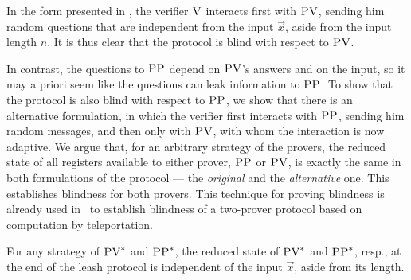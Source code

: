 \documentclass{toc}
\newcommand{\ver}{\textsc{V}}
\newcommand{\pv}{\textsc{PV}}
\newcommand{\pp}{\textsc{PP}}
\begin{document}
In the form presented in , the verifier $\ver$ interacts first with $\pv$, sending him random questions that are independent from the input $\vec{x}$, aside from the input length $n$. It is thus clear that the protocol is blind with respect to $\pv$. 

In contrast, the questions to $\pp$ depend on $\pv$'s answers and on the input, so it may a priori seem like the questions can leak information to $\pp$. To show that the protocol is also blind with respect to $\pp$, we show that there is an alternative formulation, in which the verifier first interacts with $\pp$, sending him random messages, and then only with $\pv$, with whom the interaction is now adaptive. We argue that, for an arbitrary strategy of the provers, the reduced state of all registers available to either prover, $\pp$ or $\pv$, is exactly the same in both formulations of the protocol --- the \emph{original} and the \emph{alternative} one. This establishes blindness for both provers. This technique for proving blindness is already used in~\cite{reichardt2012classical} to establish blindness of a two-prover protocol based on computation by teleportation. 

\begin{lemma}\label{lem:blindness}
For any strategy of $\pv^*$ and $\pp^*$, the reduced state of $\pv^*$
%
and $\pp^*$, resp.,  %
at the end of the leash protocol
is independent of the input $\vec{x}$, aside from its length.
\end{lemma}
\end{document}
